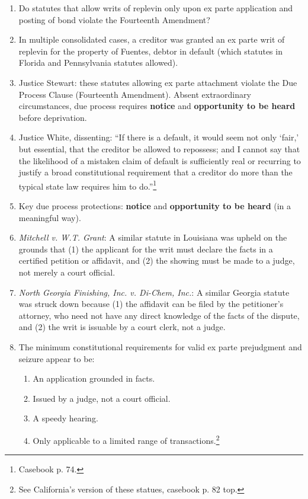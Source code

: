\begin{enumerate}
    \item Do statutes that allow writs of replevin only upon ex parte 
    application and posting of bond violate the Fourteenth Amendment?
    \item In multiple consolidated cases, a creditor was granted an ex parte 
    writ of replevin for the property of Fuentes, debtor in default (which 
    statutes in Florida and Pennsylvania statutes allowed).
    \item Justice Stewart: these statutes allowing ex parte attachment violate 
    the Due Process Clause (Fourteenth Amendment). Absent extraordinary 
    circumstances, due process requires \textbf{notice} and 
    \textbf{opportunity to be heard} before deprivation.
    \item Justice White, dissenting: ``If there is a default, it would seem 
    not only `fair,' but essential, that the creditor be allowed to repossess; 
    and I cannot say that the likelihood of a mistaken claim of default is 
    sufficiently real or recurring to justify a broad constitutional 
    requirement that a creditor do more than the typical state law requires 
    him to do.''\footnote{Casebook p. 74.}
    \item Key due process protections: \textbf{notice} and \textbf{opportunity 
    to be heard} (in a meaningful way).
    \item \emph{Mitchell v. W.T. Grant}: A similar statute in Louisiana was 
    upheld on the grounds that (1) the applicant for the writ must declare the 
    facts in a certified petition or affidavit, and (2) the showing must be 
    made to a judge, not merely a court official.
    \item \emph{North Georgia Finishing, Inc. v. Di-Chem, Inc.}: A similar 
    Georgia statute was struck down because (1) the affidavit can be filed by 
    the petitioner's attorney, who need not have any direct knowledge of the 
    facts of the dispute, and (2) the writ is issuable by a court clerk, not a 
    judge.
    \item The minimum constitutional requirements for valid ex parte 
    prejudgment and seizure appear to be:
    \begin{enumerate}
        \item An application grounded in facts.
        \item Issued by a judge, not a court official.
        \item A speedy hearing.
        \item Only applicable to a limited range of transactions.\footnote{See 
        California's version of these statues, casebook p. 82 top.}
    \end{enumerate}
\end{enumerate}

